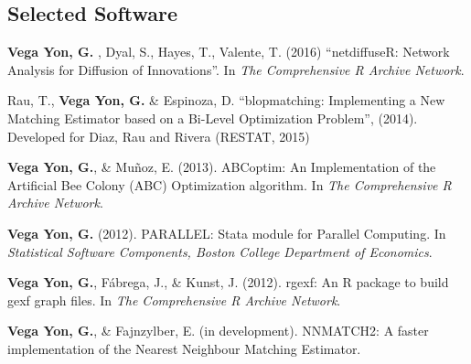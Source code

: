 \documentclass[letterpaper, 11pt]{article}
\renewenvironment{itemize}{
  \begin{list}{}{
    \setlength{\leftmargin}{0.45cm}
  }
}{
  \end{list}
}
\begin{document}
\subsection*{Selected Software}
\begin{itemize}
\item {\bf Vega Yon, G.} , Dyal, S., Hayes, T., Valente, T. (2016) ``netdiffuseR: Network Analysis for Diffusion of Innovations''. In {\it The Comprehensive R Archive Network}.
\item Rau, T., {\bf Vega Yon, G.} \& Espinoza, D. ``blopmatching: Implementing a New Matching Estimator based on a Bi-Level Optimization Problem'', (2014). Developed for Diaz, Rau and Rivera (RESTAT, 2015)
\item {\bf Vega Yon, G.}, \& Mu\~noz, E. (2013). ABCoptim: An Implementation of the Artificial Bee Colony (ABC) Optimization algorithm. In {\it The Comprehensive R Archive Network}.
\item {\bf Vega Yon, G.} (2012). PARALLEL: Stata module for Parallel Computing. In {\it Statistical Software Components, Boston College Department of Economics}.
\item {\bf Vega Yon, G.}, F\'abrega, J., \& Kunst, J. (2012). rgexf: An R package to build gexf graph files. In {\it The Comprehensive R Archive Network}.
\item {\bf Vega Yon, G.}, \& Fajnzylber, E. (in development). NNMATCH2: A faster implementation of the Nearest Neighbour Matching Estimator.
\end{itemize}

%
\end{document}
